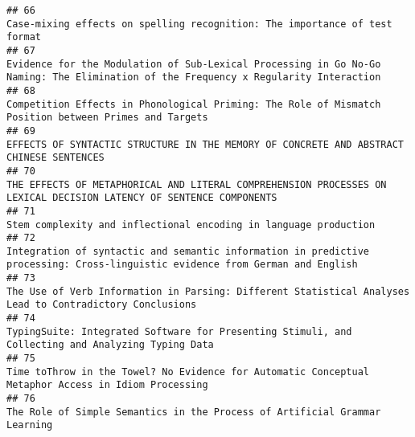 \documentclass[
  english,
  man]{apa6}
\begin{document}
\begin{verbatim}
## 66                                                                                                                                                                Case-mixing effects on spelling recognition: The importance of test format
## 67                                                                                                       Evidence for the Modulation of Sub-Lexical Processing in Go No-Go Naming: The Elimination of the Frequency x Regularity Interaction
## 68                                                                                                                                     Competition Effects in Phonological Priming: The Role of Mismatch Position between Primes and Targets
## 69                                                                                                                                                   EFFECTS OF SYNTACTIC STRUCTURE IN THE MEMORY OF CONCRETE AND ABSTRACT CHINESE SENTENCES
## 70                                                                                                                        THE EFFECTS OF METAPHORICAL AND LITERAL COMPREHENSION PROCESSES ON LEXICAL DECISION LATENCY OF SENTENCE COMPONENTS
## 71                                                                                                                                                                          Stem complexity and inflectional encoding in language production
## 72                                                                                                             Integration of syntactic and semantic information in predictive processing: Cross-linguistic evidence from German and English
## 73                                                                                                                                  The Use of Verb Information in Parsing: Different Statistical Analyses Lead to Contradictory Conclusions
## 74                                                                                                                                         TypingSuite: Integrated Software for Presenting Stimuli, and Collecting and Analyzing Typing Data
## 75                                                                                                                                       Time toThrow in the Towel? No Evidence for Automatic Conceptual Metaphor Access in Idiom Processing
## 76                                                                                                                                                                The Role of Simple Semantics in the Process of Artificial Grammar Learning

\end{verbatim}
\end{document}
